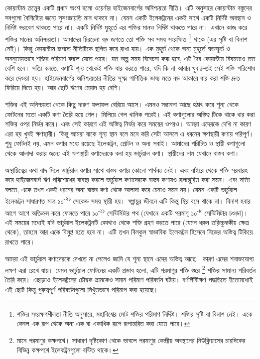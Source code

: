 \documentclass[
]{book}
\begin{document}
কোয়ান্টাম তত্ত্বের একটি প্রধান অংশ হলো ওয়ের্নার হাইজেনবার্গের অনিশ্চয়তা নীতি। এটি অনুসারে কোয়ান্টাম বস্তুদের সবগুলো বৈশিষ্ট্যের জন্যে সুসংজ্ঞায়তি মান থাকবে না। যেমন একটি ইলেকট্রনের একই সাথে একটি নির্দিষ্ট অবস্থান ও নির্দিষ্ট ভরবেগ থাকতে পারে না। একটি নির্দিষ্ট মুহূর্তে এর শক্তির মানও নির্দিষ্ট থাকতে পারে না। এখানে কাজ করে শক্তির মানের অনিশ্চয়তা। আমাদের চিরচেনা বড় জগতে তো শক্তি সব সময় সংরক্ষিত \footnote{শক্তির সংরক্ষণশীলতা নীতি অনুসারে, মহাবিশ্বের মোট শক্তির পরিমাণ নির্দিষ্ট। শক্তির সৃষ্টি বা বিনাশ নেই। একে কেবল এক রূপ থেকে অন্য এক বা একাধিক রূপে রূপান্তরিত করা যেতে পারে।} থাকে (এর সৃষ্টি বা বিনাশ নেই)। কিন্তু কোয়ান্টাম জগতে নীতিটিকে স্থগিত করে রাখা যায়। এক মুহূর্ত থেকে অন্য মুহূর্তে স্বতস্ফূর্ত ও অননুমেয়ভাবে শক্তির পরিমাণ বদলে যেতে পারে। যত অল্প সময় বিবেচনা করা হবে, এই দৈব কোয়ান্টাম বিষমতাও তত বেশি হবে। সত্যি বলতে, কণাটি শূন্য থেকেই শক্তি ধার করতে পারে, যদি কি না আবার খুব দ্রুতই সেই শক্তি পরিশোধ করে দেওয়া হয়। হাইজেনবার্গের অনিশ্চয়তার নীতির সূক্ষ্ম গাণিতিক ভাষ্য মতে বড় আকারে ধার করা শক্তি দ্রুত ফিরিয়ে দিতে হয়। আর ছোট ঋণের মেয়াদ হয় বেশি।

শক্তির এই অনিশ্চয়তা থেকে কিছু দারুণ ফলাফল বেরিয়ে আসে। এমনও সম্ভাবনা আছে হঠাৎ করে শূন্য থেকে ফোটনের মতো একটি কণা তৈরি হয়ে গেল। মিলিয়ে গেল খানিক পরেই। এই কণাগুলোর অস্তিত্ব টিকে থাকে ধার করা শক্তির ওপর নির্ভর করে। এবং সেই কারণে এই অস্তিত্ব নির্ভর করে সময়ের ওপরও। আমরা এদেরকে দেখি না কারণ এরা হয় খুবই ক্ষণস্থায়ী। কিন্তু আমরা যাকে শূন্য স্থান বলে মনে করি সেটা আসলে এ ধরনের ক্ষণস্থায়ী কণায় পরিপূর্ণ। শুধু ফোটনই নয়, এমন কণার মধ্যে রয়েছে ইলেকট্রন, প্রোটন ও অন্য সবাই। আমাদের পরিচিত ও স্থায়ী কণাগুলো থেকে আলাদা করার জন্যে এই ক্ষণস্থায়ী কণাদেরকে বলা হয় ভার্চুয়াল কণা। স্থায়ীদের নাম যেখানে বাস্তব কণা।

অস্থায়িত্বের কথা বাদ দিলে ভার্চুয়াল কণার সাথে বাস্তব কণার কোনো পার্থক্য নেই। এবং বাইরে থেকে শক্তি সরবারহ করে হাইজেনবার্গ ঋণ পরিশোধের ব্যবস্থা করলে ভার্চুয়াল কণাদেরকে বাস্তব কণায়ও রূপান্তুরিত করা সম্ভব। এবং সত্যি বলতে, একে তখন একই ধরনের অন্য বাস্তব কণা থেকে আলাদা করে চেনাও সম্ভব নয়। যেমন একটি ভার্চুয়াল ইলেকট্রন সাধারণত মাত্র ১০\textsuperscript{-২১} সেকেন্ড সময় স্থায়ী হয়। স্বল্পায়ুর জীবনে এটি কিন্তু স্থির বসে থাকে না। বিনাশ হবার আগে আগে অতিক্রম করে ফেলতে পারে ১০\textsuperscript{-১১} সেন্টিমিটার পথ (যেখানে একটি পরমাণু ১০\textsuperscript{-৮} সেন্টিমিটার চওড়া)। এই সময়ের মধ্যেই যদি ভার্চুয়াল ইলেকট্রনটি কোথাও থেকে শক্তি গ্রহণ করতে পারে (যেমন ধরুন তড়িচ্চুম্বকীয় ক্ষেত্র থেকে), তাহলে আর একে বিলুপ্ত হতে হবে না। এটি তখন বিলকুল স্বাভাবিক ইলেকট্রন হিসেবে নিজের অস্তিত্ব টিকিয়ে রাখতে পারে।

আমরা এই ভার্চুয়াল কণাদেরকে দেখতে না পেলেও জানি যে শূন্য স্থানে এদের অস্তিত্ব আছে। কারণ এদের শনাক্তযোগ্য লক্ষণ এরা রেখে যায়। যেমন ভার্চুয়াল ফোটনের একটি প্রভাব হলো, এটি পরমাণুর শক্তি স্তরে \footnote{মানে পরমাণুর কক্ষপথে। সাধারণ দৃষ্টিকোণ থেকে ভাবলে পরমাণুর কেন্দ্রীয় অবস্থানের নিউক্লিয়াসের চারদিকের বিভিন্ন কক্ষপথে ইলেকট্রনগুলো বন্টিত থাকে।} শক্তির সামান্য পরিবর্তন তৈরি করে। এছাড়াও ইলেকট্রনের চৌম্বক ভ্রামকেও সমান পরিমাণ পরিবর্তন ঘটায়। বর্ণালীবীক্ষণ পদ্ধতিতে ইতোমধ্যেই এই ছোট কিন্তু গুরুত্বপূর্ণ পরিবর্তনগুলো নিখুঁতভাবে পরিমাপ করা হয়েছে।
\end{document}
